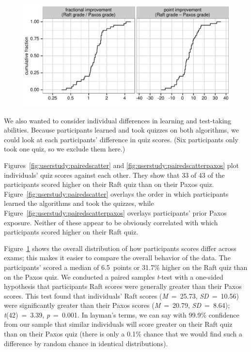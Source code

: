 \begin{figure}
\centering
{
\includegraphics{userstudy/pairedcdf}
}
\label{fig:userstudy:pairedcdf}
\end{figure}

We also wanted to consider individual differences in learning and
test-taking abilities. Because participants learned and took quizzes
on both algorithms, we could look at each participants' difference in
quiz scores. (Six participants only took one quiz, so we exclude them
here.)

Figures~\ref{fig:userstudy:pairedscatter} and \ref{fig:userstudy:pairedscatterpaxos} plot
individuals' quiz scores against each other. They show that 33 of 43 of
the participants scored higher on their Raft quiz than on their Paxos
quiz. Figure~\ref{fig:userstudy:pairedscatter} overlays the order in which
participants learned the algorithms and took the quizzes, while
Figure~\ref{fig:userstudy:pairedscatterpaxos} overlays participants' prior Paxos
exposure. Neither of these appear to be obviously correlated with which
participants scored higher on their Raft quiz.

Figure~\ref{fig:userstudy:pairedcdf} shows the overall distribution of
how participants scores differ across exams; this makes it easier to
compare the overall behavior of the data.
The participants' scored a median of \SI{6.5}{points} or
31.7\% higher on
the Raft quiz than on the Paxos quiz.
We conducted a paired samples \emph{t}-test with a one-sided
hypothesis that participants Raft scores were generally greater than
their Paxos scores.
This test found that
individuals' Raft scores (\emph{M}~=~25.73, \emph{SD}~=~10.56) were
significantly
greater than their Paxos scores (\emph{M}~=~20.79, \emph{SD}~=~8.64);
\emph{t}(42)~=~3.39, \emph{p}~=~0.001.
In layman's terms, we can say with 99.9\%
confidence from our sample that similar individuals will
score greater on their Raft quiz than on their Paxos quiz
(there is only a 0.1\%
chance that we would find such a difference by
random chance in identical distributions).

